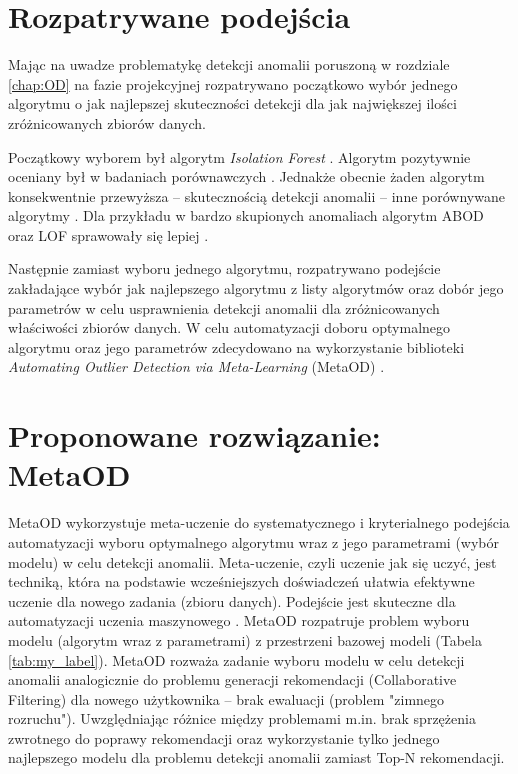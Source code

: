 \section{Rozpatrywane podejścia}
Mając na uwadze problematykę detekcji anomalii poruszoną w rozdziale \ref{chap:OD} na fazie projekcyjnej rozpatrywano początkowo wybór jednego algorytmu o jak najlepszej skuteczności detekcji dla jak największej ilości zróżnicowanych zbiorów danych. 

Początkowy wyborem był algorytm \textit{Isolation Forest} \cite{iforest}. Algorytm pozytywnie oceniany był w badaniach porównawczych \cite{emmott2015meta,aggarwal2017ens}. Jednakże obecnie żaden algorytm konsekwentnie przewyższa -- skutecznością detekcji anomalii -- inne porównywane algorytmy \cite{aggarwal2017ens}. Dla przykładu w bardzo skupionych anomaliach algorytm ABOD \cite{abod} oraz LOF \cite{lof} sprawowały się lepiej \cite{emmott2015meta}. 

Następnie zamiast wyboru jednego algorytmu, rozpatrywano podejście zakładające wybór jak najlepszego algorytmu z listy algorytmów oraz dobór jego parametrów w celu usprawnienia detekcji anomalii dla zróżnicowanych właściwości zbiorów danych. 
W celu automatyzacji doboru optymalnego algorytmu oraz jego parametrów zdecydowano na wykorzystanie biblioteki \textit{Automating Outlier Detection via Meta-Learning} (MetaOD) \cite{zhao2020metaod}. 

\section{Proponowane rozwiązanie: MetaOD}
\label{sec:MetaOD}
MetaOD wykorzystuje meta-uczenie do systematycznego i kryterialnego podejścia automatyzacji wyboru optymalnego algorytmu wraz z jego parametrami (wybór modelu) w celu detekcji anomalii. Meta-uczenie, czyli uczenie jak się uczyć, jest techniką, która na podstawie wcześniejszych doświadczeń ułatwia efektywne uczenie dla nowego zadania (zbioru danych). Podejście jest skuteczne dla automatyzacji uczenia maszynowego \cite{vanschoren2018meta}. MetaOD rozpatruje problem wyboru modelu (algorytm wraz z parametrami) z przestrzeni bazowej modeli (Tabela \ref{tab:my_label}). MetaOD rozważa zadanie wyboru modelu w celu detekcji anomalii analogicznie
do problemu generacji rekomendacji (Collaborative Filtering) dla nowego użytkownika -- brak ewaluacji (problem "zimnego rozruchu"). Uwzględniając różnice między problemami m.in. brak sprzężenia zwrotnego do poprawy rekomendacji oraz wykorzystanie tylko jednego najlepszego modelu dla problemu detekcji anomalii zamiast Top-N rekomendacji.

